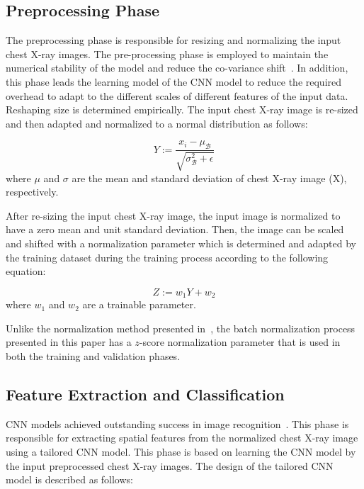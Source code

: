 \subsection{Preprocessing Phase}

The preprocessing phase is responsible for resizing and normalizing the input chest X-ray images. The pre-processing phase is employed to maintain the numerical stability of the model and reduce the co-variance shift~\cite{lecun1989handwritten}. In addition, this phase leads the learning model of the CNN model to reduce the required overhead to adapt to the different scales of different features of the input data. Reshaping size is determined empirically. The input chest X-ray image is re-sized and then adapted and normalized to a normal distribution as follows:

\begin{equation}
Y := \frac{x_i - \mu_{\mathcal B}}{\sqrt{\sigma_{\mathcal B}^2 + \epsilon}}
\label{eq1}
\end{equation}
where $\mu$ and $\sigma$ are the mean and standard deviation of chest X-ray image (X), respectively.

After re-sizing the input chest X-ray image, the input image is normalized to have a zero mean and unit standard deviation. Then,  the image can be scaled and shifted with a normalization parameter which is determined and adapted by the training dataset during the training process according to the following equation: 

\begin{equation}
Z := w_1 Y + w_2
\label{eq2}
\end{equation}
where $w_1$ and $w_2$ are a trainable parameter.

Unlike the normalization method presented in~\cite{ioffe2015batch}, the batch normalization process presented in this paper has a $z$-score normalization parameter that is used in both the training and validation phases.


\subsection{Feature Extraction and Classification}

CNN models achieved outstanding success in image recognition~\cite{lecun2015deep}. This phase is responsible for extracting spatial features from the normalized chest X-ray image using a tailored CNN model.  This phase is based on learning the CNN model by the input preprocessed chest X-ray images. The design of the tailored CNN model is described as follows: 

